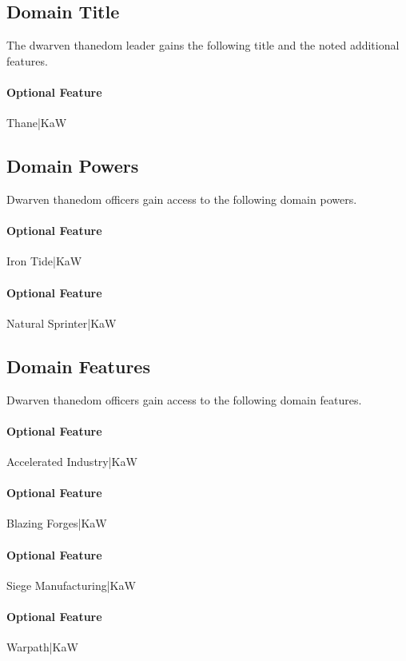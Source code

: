 \documentclass[10pt,a4paper,twoside,bg=print,twocolumn,openany,nodeprecatedcode]{dndbook}
\begin{document}
\subsection{Domain Title}
The dwarven thanedom leader gains the following title and the noted additional features.

\paragraph{Optional Feature}
Thane|KaW

\subsection{Domain Powers}
Dwarven thanedom officers gain access to the following domain powers.

\paragraph{Optional Feature}
Iron Tide|KaW

\paragraph{Optional Feature}
Natural Sprinter|KaW

\subsection{Domain Features}
Dwarven thanedom officers gain access to the following domain features.

\paragraph{Optional Feature}
Accelerated Industry|KaW

\paragraph{Optional Feature}
Blazing Forges|KaW

\paragraph{Optional Feature}
Siege Manufacturing|KaW

\paragraph{Optional Feature}
Warpath|KaW
\end{document}
